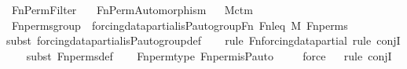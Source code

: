 %
\begin{isabellebody}%
%
%
\isadelimtheory
%
\endisadelimtheory
%
\isatagtheory
{}\isamarkupfalse%
\ Fn{\isacharunderscore}{\kern0pt}Perm{\isacharunderscore}{\kern0pt}Filter\isanewline
\ \ \ Fn{\isacharunderscore}{\kern0pt}Perm{\isacharunderscore}{\kern0pt}Automorphism\isanewline
{}%
\endisatagtheory
{\isafoldtheory}%
%
\isadelimtheory
\ \isanewline
%
\endisadelimtheory
\isanewline
{}\isamarkupfalse%
\ M{\isacharunderscore}{\kern0pt}ctm\ \ \isanewline
\isanewline
{}\isamarkupfalse%
\ Fn{\isacharunderscore}{\kern0pt}perms{\isacharunderscore}{\kern0pt}group\ {\isacharcolon}{\kern0pt}\ {\isachardoublequoteopen}forcing{\isacharunderscore}{\kern0pt}data{\isacharunderscore}{\kern0pt}partial{\isachardot}{\kern0pt}is{\isacharunderscore}{\kern0pt}P{\isacharunderscore}{\kern0pt}auto{\isacharunderscore}{\kern0pt}group{\isacharparenleft}{\kern0pt}Fn{\isacharcomma}{\kern0pt}\ Fn{\isacharunderscore}{\kern0pt}leq{\isacharcomma}{\kern0pt}\ M{\isacharcomma}{\kern0pt}\ Fn{\isacharunderscore}{\kern0pt}perms{\isacharparenright}{\kern0pt}{\isachardoublequoteclose}\ \isanewline
%
\isadelimproof
\ \ %
\endisadelimproof
%
\isatagproof
{}\isamarkupfalse%
{\isacharparenleft}{\kern0pt}subst\ forcing{\isacharunderscore}{\kern0pt}data{\isacharunderscore}{\kern0pt}partial{\isachardot}{\kern0pt}is{\isacharunderscore}{\kern0pt}P{\isacharunderscore}{\kern0pt}auto{\isacharunderscore}{\kern0pt}group{\isacharunderscore}{\kern0pt}def{\isacharparenright}{\kern0pt}\isanewline
\ \ \ \isamarkupfalse%
{\isacharparenleft}{\kern0pt}rule\ Fn{\isacharunderscore}{\kern0pt}forcing{\isacharunderscore}{\kern0pt}data{\isacharunderscore}{\kern0pt}partial{\isacharcomma}{\kern0pt}\ rule\ conjI{\isacharparenright}{\kern0pt}\isanewline
\ \ \ \isamarkupfalse%
{\isacharparenleft}{\kern0pt}subst\ Fn{\isacharunderscore}{\kern0pt}perms{\isacharunderscore}{\kern0pt}def{\isacharparenright}{\kern0pt}\isanewline
\ \ \isamarkupfalse%
\ Fn{\isacharunderscore}{\kern0pt}perm{\isacharprime}{\kern0pt}{\isacharunderscore}{\kern0pt}type\ Fn{\isacharunderscore}{\kern0pt}perm{\isacharprime}{\kern0pt}{\isacharunderscore}{\kern0pt}is{\isacharunderscore}{\kern0pt}P{\isacharunderscore}{\kern0pt}auto\isanewline
\ \ \ \isamarkupfalse%
\ force\isanewline
\ \ \isamarkupfalse%
{\isacharparenleft}{\kern0pt}rule\ conjI{\isacharparenright}{\kern0pt}\isanewline

\end{isabellebody}
